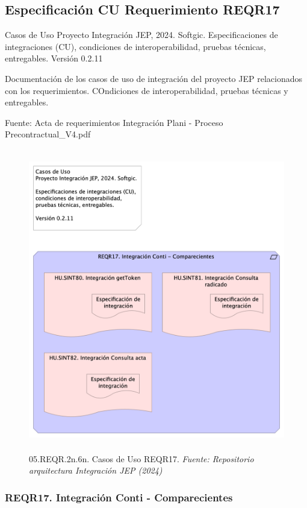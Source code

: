 \documentclass[
  paper=a4,
  ,captions=tableheading
]{scrartcl}
\renewenvironment{quote}{\begin{customblockquote}\list{}{\rightmargin=0em\leftmargin=0em}%
\item\relax\color{blockquote-text}\ignorespaces}{\unskip\unskip\endlist\end{customblockquote}}
\begin{document}
\subsection{Especificación CU Requerimiento
REQR17}\label{sec:especificaciuxf3n-cu-requerimiento-reqr17}

\begin{quote}
Casos de Uso Proyecto Integración JEP, 2024. Softgic. Especificaciones
de integraciones (CU), condiciones de interoperabilidad, pruebas
técnicas, entregables. Versión 0.2.11
\end{quote}

Documentación de los casos de uso de integración del proyecto JEP
relacionados con los requerimientos. COndiciones de interoperabilidad,
pruebas técnicas y entregables.

Fuente: Acta de requerimientos Integración Plani - Proceso
Precontractual\_V4.pdf

\begin{figure}
\centering
\includegraphics[width=\textwidth,height=5.20833in]{images/05.REQR.2n.6n.CasosdeUsoREQR17.png}
\caption{05.REQR.2n.6n. Casos de Uso REQR17. \emph{Fuente: Repositorio
arquitectura Integración JEP
(2024)}}\label{fig:id-b26cb894f0174c24a656c8219ba3076c}
\end{figure}

\subsubsection{REQR17. Integración Conti -
Comparecientes}\label{sec:reqr17.-integraciuxf3n-conti---comparecientes-1}
\end{document}
